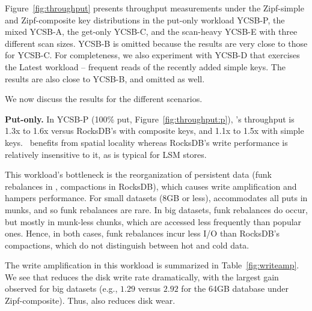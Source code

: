 Figure~\ref{fig:throughput} presents throughput measurements under the Zipf-simple and 
Zipf-composite key distributions in the put-only workload YCSB-P, the mixed YCSB-A, 
the get-only YCSB-C, and the scan-heavy YCSB-E with three different scan 
sizes. YCSB-B is omitted because the results are very close to those for YCSB-C. 
For completeness, we also experiment with YCSB-D that exercises the 
Latest workload -- frequent reads of the recently added simple keys. The results are
also close to YCSB-B, and omitted as well. 

We now discuss the results for the different scenarios.

  
{\bf Put-only.} 
In {YCSB-P} (100\% put, Figure~\ref{fig:throughput:p}), 
\sys's throughput is 1.3x to 1.6x versus RocksDB's with composite keys, 
and 1.1x to 1.5x with simple keys. 
\sys\ benefits from spatial locality whereas RocksDB's write performance 
is relatively insensitive to it, as is typical for LSM stores.

This workload's bottleneck is the reorganization of persistent data  
(funk rebalances in \sys, compactions in RocksDB), which causes 
write amplification and hampers performance. 
For small datasets (8GB or less), \sys\/ accommodates all puts in munks, and so
funk rebalances are rare. In big datasets, funk rebalances do occur, but mostly in munk-less 
chunks, which are accessed less frequently than popular ones. 
Hence, in both cases, funk rebalances incur less I/O than RocksDB's compactions, which do not 
distinguish between hot and cold data. 

{}

The write amplification in this workload is summarized in 
Table~\ref{fig:writeamp}. We see that \sys\/ reduces the disk write rate dramatically, 
with the largest gain observed for big datasets (e.g., $1.29$ versus $2.92$ for the 64GB 
database under Zipf-composite). Thus, \sys\/ also reduces disk wear.  


